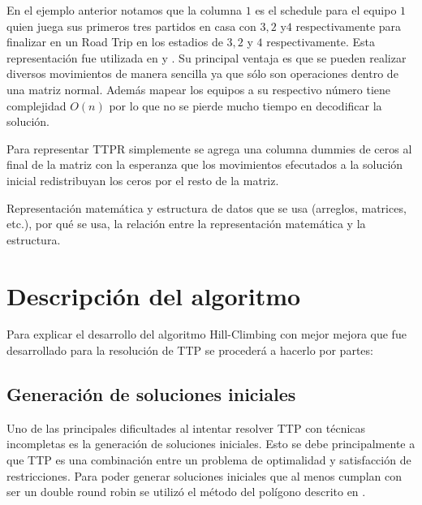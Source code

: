 \documentclass[letter, 10pt]{article}
\begin{document}
    En el ejemplo anterior notamos que la columna $1$ es el schedule para el equipo $1$ quien juega sus primeros tres partidos en casa con $3,2$ y$4$ respectivamente para finalizar en un Road Trip en los estadios de $3,2$ y $4$ respectivamente. Esta representación fue utilizada en \cite{Tabu} y \cite{simulated}. Su principal ventaja es que se pueden realizar diversos movimientos de manera sencilla ya que sólo son operaciones dentro de una matriz normal. Además mapear los equipos a su respectivo número tiene complejidad $O(n)$ por lo que no se pierde mucho tiempo en decodificar la solución.
    
    Para representar TTPR simplemente se agrega una columna dummies de ceros al final de la matriz con la esperanza que los movimientos efecutados a la solución inicial redistribuyan los ceros por el resto de la matriz.
    
    
Representaci\'on matem\'atica y estructura de datos que se usa (arreglos, matrices, etc.), por qu\'e se usa, la relaci\'on entre la 
representaci\'on matem\'atica y la estructura.

\section{Descripci\'on del algoritmo}
Para explicar el desarrollo del algoritmo Hill-Climbing con mejor mejora que fue desarrollado para la resolución de TTP se procederá a hacerlo por partes:

\subsection{Generación de soluciones iniciales}
    Uno de las principales dificultades al intentar resolver TTP con técnicas incompletas es la generación de soluciones iniciales. Esto se debe principalmente a que TTP es una combinación entre un problema de optimalidad y satisfacción de restricciones. Para poder generar soluciones iniciales que al menos cumplan con ser un double round robin se utilizó el método del polígono descrito en \cite{poligono}. 
    
\end{document}
